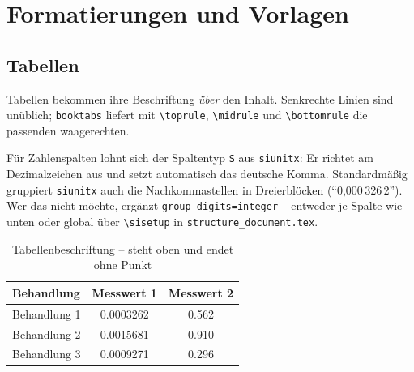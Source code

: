 %
%

\chapter{Formatierungen und Vorlagen}
\label{ch:formatbeispiele}


\section{Tabellen}

Tabellen bekommen ihre Beschriftung \emph{über} den Inhalt. Senkrechte Linien
sind unüblich; \texttt{booktabs} liefert mit \verb|\toprule|, \verb|\midrule|
und \verb|\bottomrule| die passenden waagerechten.

Für Zahlenspalten lohnt sich der Spaltentyp \texttt{S} aus \texttt{siunitx}:
Er richtet am Dezimalzeichen aus und setzt automatisch das deutsche Komma.
Standardmäßig gruppiert \texttt{siunitx} auch die Nachkommastellen in
Dreierblöcken (\enquote{0,000\,326\,2}). Wer das nicht möchte, ergänzt
\texttt{group-digits=integer} -- entweder je Spalte wie unten oder global
über \verb|\sisetup| in \texttt{structure\_document.tex}.

\begin{table}[htbp]
	\centering
	\caption{Tabellenbeschriftung -- steht oben und endet ohne Punkt}
	\label{tab:beispiel}
	\begin{tabular}{l S[table-format=1.7, group-digits=integer] S[table-format=1.3]}
		\toprule
		\textbf{Behandlung} & {\textbf{Messwert 1}} & {\textbf{Messwert 2}} \\
		\midrule
		Behandlung 1 & 0.0003262 & 0.562 \\
		Behandlung 2 & 0.0015681 & 0.910 \\
		Behandlung 3 & 0.0009271 & 0.296 \\
		\bottomrule
	\end{tabular}
\end{table}

